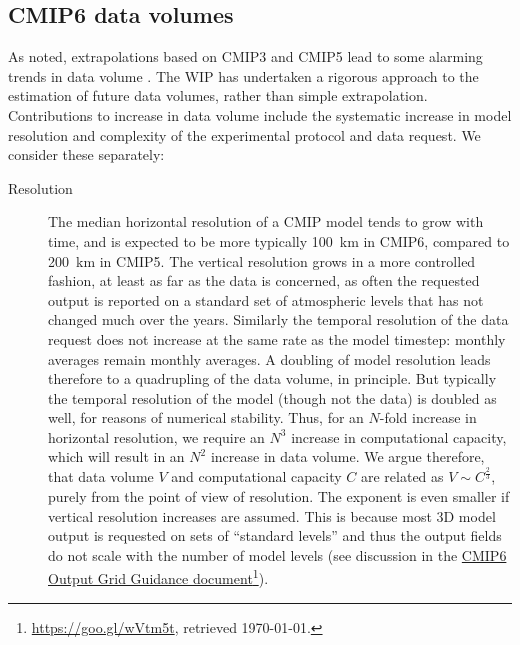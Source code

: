 \documentclass[gmd,manuscript]{copernicus}
\newcommand{\pllabel}[1]{\label{p-#1}\linelabel{l-#1}}
\newcommand{\urlref}[2] {\href{#1}{#2}\footnote{\url{#1}, retrieved \today.}}
\begin{document}
\subsection{CMIP6 data volumes}
\label{sec:dvol}

As noted, extrapolations based on CMIP3 and CMIP5 lead to some
alarming trends in data volume \citep[see
e.g.,][]{ref:overpecketal2011}. The WIP has undertaken a rigorous
approach to the estimation of future data volumes, rather than simple
extrapolation. Contributions to increase in data volume include the
systematic increase in model resolution and complexity of the
experimental protocol and data request. We consider these separately:

\begin{description}
\item[Resolution] The median horizontal resolution of a CMIP model
  tends to grow with time, and is expected to be more typically 100~km
  in CMIP6, compared to 200~km in CMIP5. The vertical resolution grows
  in a more controlled fashion, at least as far as the data is
  concerned, as often the requested output is reported on a standard
  set of atmospheric levels that has not changed much over the years.
  Similarly the temporal resolution of the data request does not
  increase at the same rate as the model timestep: monthly averages
  remain monthly averages. A doubling of model resolution leads
  therefore to a quadrupling of the data volume, in principle. But
  typically the temporal resolution of the model (though not the data)
  is doubled as well, for reasons of numerical stability. Thus, for an
  $N$-fold increase in horizontal resolution, we require an $N^3$
  increase in computational capacity, which will result in an $N^2$
  increase in data volume. We argue therefore, that data volume $V$
  and computational capacity $C$ are related as $V \sim C^\frac23$,
  purely from the point of view of resolution. The exponent is even
  smaller if vertical resolution increases are assumed.
  \pllabel{RC1-18}
  This is because most 3D model output is requested on sets of
  ``standard levels'' and thus the output fields do not scale with the
  number of model levels (see discussion in the
  \urlref{https://goo.gl/wVtm5t}{CMIP6 Output Grid Guidance
    document}).
  

\end{description}
\end{document}
